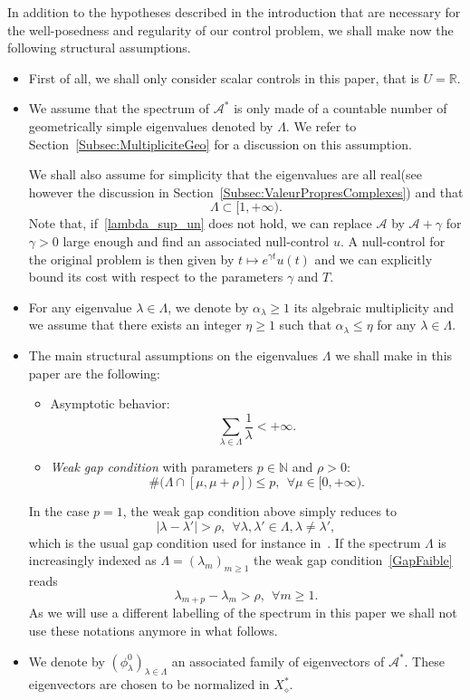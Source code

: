 \documentclass[AHL,Unicode,longabstracts]{cedram}
\newcommand\A{\mathcal{A}}
\newcommand\As{\mathcal{A}^*}
\newcommand{\Xalphas}{X_\diamond^*}
\newcommand{\N}{\mathbb{N}}
\newcommand{\R}{\mathbb{R}}
\let\oldforall\forall
\renewcommand*{\forall}{\mathrel{\oldforall}}
\begin{document}
In addition to the hypotheses described in the introduction that are necessary for the well-posedness and regularity of our control problem, we shall make now the following structural assumptions.
\begin{itemize}
\item First of all, we shall only consider scalar controls in this paper, that is $U=\R$.
\item We assume that the spectrum of $\As$ is only made of a countable number of geometrically simple eigenvalues denoted by $\Lambda$. We refer to Section~\ref{Subsec:MultipliciteGeo} for a discussion on this assumption.

We shall also assume for simplicity that the eigenvalues are all real\linebreak(see however the discussion in Section~\ref{Subsec:ValeurPropresComplexes}) and that
\begin{equation}\label{lambda_sup_un}
\Lambda\subset[1,+\infty).
\end{equation}
Note that, if~\eqref{lambda_sup_un} does not hold, we can replace $\A$ by $\A+\gamma$ for $\gamma>0$ large enough and find an associated null-control $u$. A null-control for the original problem is then given by $t\mapsto e^{\gamma t} u(t)$ and we can explicitly bound its cost with respect to the parameters $\gamma$ and $T$.
\item For any eigenvalue $\lambda \in \Lambda$, we denote by $\alpha_\lambda \geq 1$ its algebraic multiplicity and we assume that there exists an integer $\eta \geq 1$ such that $\alpha_\lambda\leq \eta$ for any $\lambda\in \Lambda$.
\item The main structural assumptions on the eigenvalues $\Lambda$ we shall make in this paper are the following:
\begin{itemize}
\item Asymptotic behavior:
\begin{equation}\label{SommabiliteVP}
\sum_{\lambda\in \Lambda} \frac{1}{\lambda} < +\infty.
\end{equation}
\item \emph{Weak gap condition} with parameters $p\in \N$ and $\rho>0$:
\begin{equation}\label{GapFaible}
\# \bigg(\Lambda \cap [\mu,\mu+\rho] \bigg) \leq p, \ \ \forall \mu\in [0,+\infty).
\end{equation}
\end{itemize}
In the case $p=1$, the weak gap condition above simply reduces to
\[
|\lambda-\lambda'|> \rho, \ \ \forall \lambda,\lambda'\in \Lambda, \lambda\neq\lambda',
\]
which is the usual gap condition used for instance in~\cite{FattoriniRussell71}. If the spectrum $\Lambda$ is increasingly indexed as $\Lambda= (\lambda_m)_{m \geq 1}$ the weak gap condition~\eqref{GapFaible} reads
\[
\lambda_{m+p}-\lambda_m > \rho, \ \ \forall m \geq 1.
\]
As we will use a different labelling of the spectrum in this paper we shall not use these notations anymore in what follows.
\item We denote by $(\phi_\lambda^0)_{\lambda\in \Lambda}$ an associated family of eigenvectors of $\As$. These eigenvectors are chosen to be normalized in $\Xalphas$.


\end{itemize}
\end{document}
